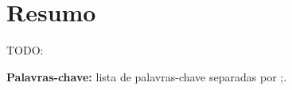 \chapter*{Resumo}\label{ch:resumo}

TODO:

\textbf{Palavras-chave:} lista de palavras-chave separadas por ;.
